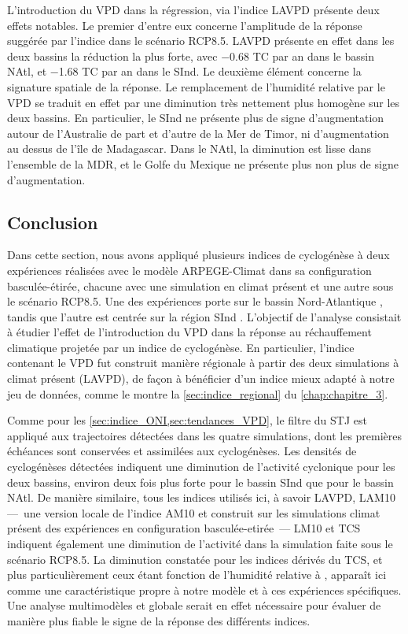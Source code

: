 \documentclass[../main.tex]{subfiles}
\begin{document}
L'introduction du VPD dans la régression, via l'indice LAVPD présente deux effets notables. Le premier d'entre eux concerne l'amplitude de la réponse suggérée
par l'indice dans le scénario RCP8.5. LAVPD présente en effet dans les deux bassins la réduction la plus forte, avec \num{-0.68} TC par an dans le bassin NAtl,
et \num{-1.68} TC par an dans le SInd. Le deuxième élément concerne la signature spatiale de la réponse. Le remplacement de l'humidité relative par le VPD se
traduit en effet par une diminution très nettement plus homogène sur les deux bassins. En particulier, le SInd ne présente plus de signe d'augmentation autour
de l'Australie de part et d'autre de la Mer de Timor, ni d'augmentation au dessus de l'île de Madagascar. Dans le NAtl, la diminution est lisse dans l'ensemble
de la MDR, et le Golfe du Mexique ne présente plus non plus de signe d'augmentation.

\subsection{Conclusion}

Dans cette section, nous avons appliqué plusieurs indices de cyclogénèse à deux expériences réalisées avec le modèle ARPEGE-Climat dans sa configuration
basculée-étirée, chacune avec une simulation en climat présent et une autre sous le scénario RCP8.5. Une des expériences porte sur le bassin Nord-Atlantique
\parencite{chauvin_future_2020}, tandis que l'autre est centrée sur la région SInd \parencite{cattiaux_projected_2020}. L'objectif de l'analyse consistait à
étudier l'effet de l'introduction du VPD dans la réponse au réchauffement climatique projetée par un indice de cyclogénèse. En particulier, l'indice contenant
le VPD fut construit manière régionale à partir des deux simulations à climat présent (LAVPD), de façon à bénéficier d'un indice mieux adapté à notre jeu de données,
comme le montre la \cref{sec:indice_regional} du \cref{chap:chapitre_3}.

Comme pour les \cref{sec:indice_ONI,sec:tendances_VPD}, le filtre du STJ est appliqué aux trajectoires détectées dans les quatre simulations, dont les premières
échéances sont conservées et assimilées aux cyclogénèses. Les densités de cyclogénèses détectées indiquent une diminution de l'activité cyclonique pour les deux
bassins, environ deux fois plus forte pour le bassin SInd que pour le bassin NAtl. De manière similaire, tous les indices utilisés ici, à savoir LAVPD, LAM10
---~une version locale de l'indice AM10 et construit sur les simulations climat présent des expériences en configuration basculée-etirée~--- LM10 et TCS
indiquent également une diminution de l'activité dans la simulation faite sous le scénario RCP8.5. La diminution constatée pour les indices dérivés du TCS, et
plus particulièrement ceux étant fonction de l'humidité relative à , apparaît ici comme une caractéristique propre à notre modèle et à ces expériences
spécifiques. Une analyse multimodèles et globale serait en effet nécessaire pour évaluer de manière plus fiable le signe de la réponse des différents indices.
\end{document}
